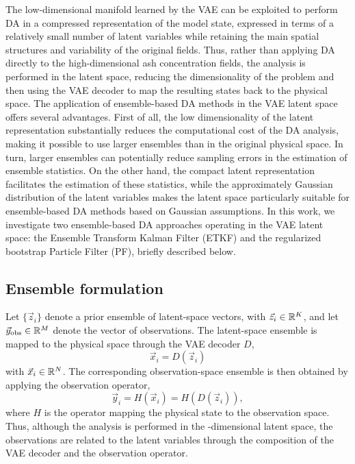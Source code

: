 The low-dimensional manifold learned by the VAE can be exploited to perform DA in a compressed representation of the model state, expressed in terms of a relatively small number of latent variables while retaining the main spatial structures and variability of the original fields. Thus, rather than applying DA directly to the high-dimensional ash concentration fields, the analysis is performed in the latent space, reducing the dimensionality of the problem and then using the VAE decoder to map the resulting states back to the physical space.
%
The application of ensemble-based DA methods in the VAE latent space offers several advantages. First of all, the low dimensionality of the latent representation substantially reduces the computational cost of the DA analysis, making it possible to use larger ensembles than in the original physical space. In turn, larger ensembles can potentially reduce sampling errors in the estimation of ensemble statistics. On the other hand, the compact latent representation facilitates the estimation of these statistics, while the approximately Gaussian distribution of the latent variables makes the latent space particularly suitable for ensemble-based DA methods based on Gaussian assumptions. In this work, we investigate two ensemble-based DA approaches operating in the VAE latent space: the Ensemble Transform Kalman Filter (ETKF) and the regularized bootstrap Particle Filter (PF), briefly described below.
%
%
\subsection{Ensemble formulation}
Let $\{ \vec{z}_i \}$ denote a prior ensemble of \ensSize latent-space vectors, with $\vec{z}_i \in \mathbb{R}^{K}$, and let $\vec{y}_{\mathrm{obs}} \in \mathbb{R}^{M}$ denote the vector of \obsDim observations. The latent-space ensemble is mapped to the physical space through the VAE decoder $D$,
%
\begin{equation}
\vec{x}_i = D(\vec{z}_i)
\end{equation}
%
with $\vec{x}_i \in \mathbb{R}^{N}$. The corresponding observation-space ensemble is then obtained by applying the observation operator, 
%
\begin{equation}
\vec{y}_i = H(\vec{x}_i) = H(D(\vec{z}_i)),
\end{equation}
%
where $H$ is the operator mapping the physical state to the observation space. Thus, although the analysis is performed in the \latentDim-dimensional latent space, the observations are related to the latent variables through the composition of the VAE decoder and the observation operator. 

